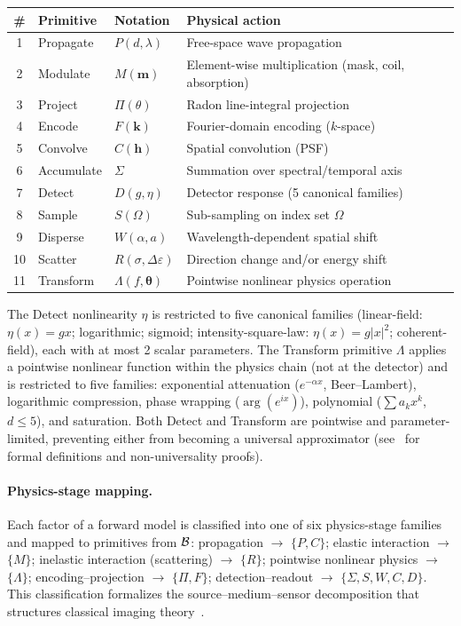 \begin{table}[h]
\centering\small
\begin{tabular}{@{}clll@{}}
\toprule
\# & Primitive & Notation & Physical action \\
\midrule
1 & Propagate  & $P(d,\lambda)$ & Free-space wave propagation \\
2 & Modulate   & $M(\mathbf{m})$ & Element-wise multiplication (mask, coil, absorption) \\
3 & Project    & $\Pi(\theta)$ & Radon line-integral projection \\
4 & Encode     & $F(\mathbf{k})$ & Fourier-domain encoding ($k$-space) \\
5 & Convolve   & $C(\mathbf{h})$ & Spatial convolution (PSF) \\
6 & Accumulate & $\Sigma$ & Summation over spectral/temporal axis \\
7 & Detect     & $D(g,\eta)$ & Detector response (5 canonical families) \\
8 & Sample     & $S(\Omega)$ & Sub-sampling on index set $\Omega$ \\
9 & Disperse   & $W(\alpha,a)$ & Wavelength-dependent spatial shift \\
10 & Scatter   & $R(\sigma,\Delta\varepsilon)$ & Direction change and/or energy shift \\
11 & Transform & $\Lambda(f,\boldsymbol{\theta})$ & Pointwise nonlinear physics operation \\
\bottomrule
\end{tabular}
\end{table}

\noindent The Detect nonlinearity $\eta$ is restricted to five canonical families (linear-field: $\eta(x) = gx$; logarithmic; sigmoid; intensity-square-law: $\eta(x) = g|x|^2$; coherent-field), each with at most 2 scalar parameters. The Transform primitive $\Lambda$ applies a pointwise nonlinear function within the physics chain (not at the detector) and is restricted to five families: exponential attenuation ($e^{-\alpha x}$, Beer--Lambert), logarithmic compression, phase wrapping ($\arg(e^{ix})$), polynomial ($\sum a_k x^k$, $d \leq 5$), and saturation. Both Detect and Transform are pointwise and parameter-limited, preventing either from becoming a universal approximator (see~\cite{yang2026fpt} for formal definitions and non-universality proofs).

\paragraph{Physics-stage mapping.}
Each factor of a forward model is classified into one of six physics-stage families and mapped to primitives from $\mathcal{B}$: propagation $\to$ $\{P, C\}$; elastic interaction $\to$ $\{M\}$; inelastic interaction (scattering) $\to$ $\{R\}$; pointwise nonlinear physics $\to$ $\{\Lambda\}$; encoding--projection $\to$ $\{\Pi, F\}$; detection--readout $\to$ $\{\Sigma, S, W, C, D\}$. This classification formalizes the source--medium--sensor decomposition that structures classical imaging theory~\cite{brady2009optical}.

